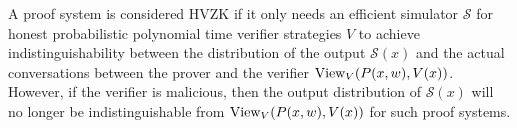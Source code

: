 \begin{definition}\label{def:hvzk}
A proof system is considered HVZK if it only needs an efficient simulator $\mathcal S$ for honest probabilistic polynomial time verifier strategies $V$ to achieve indistinguishability between the distribution of the output $\mathcal S(x)$ and the actual conversations between the prover and the verifier $\text{View}_V(P(x,w),V(x))$. However, if the verifier is malicious, then the output distribution of $\mathcal S(x)$ will no longer be indistinguishable from $\text{View}_V(P(x,w),V(x))$ for such proof systems.
\end{definition}
